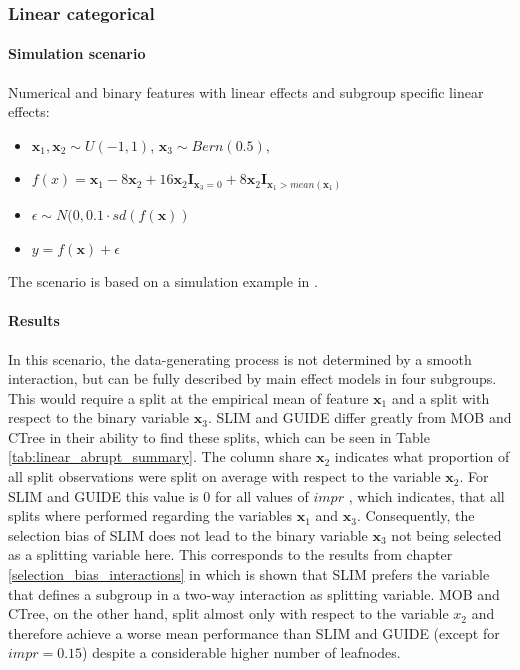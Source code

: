 \subsubsection{Linear categorical} 

\paragraph{Simulation scenario}
Numerical and binary features with linear effects and subgroup specific linear effects:
\begin{itemize}
    \item $\textbf{x}_1, \textbf{x}_2 \sim U(-1,1)$, $\textbf{x}_3 \sim Bern(0.5)$,  
    \item $ f(x) =  \textbf{x}_{1} - 8  \textbf{x}_2 + 16  \textbf{x}_2  \mathbf{I}_{\textbf{x}_3 = 0} + 8  \textbf{x}_2  \mathbf{I}_{\textbf{x}_1 > mean(\textbf{x}_1)} $
    \item $\epsilon \sim N(0, 0.1 \cdot sd(f(\textbf{x}))$
    \item $y = f(\textbf{x}) + \epsilon$          
\end{itemize}

The scenario is based on a simulation example in \citep{Herbinger.2022}.

\paragraph{Results}
In this scenario, the data-generating process is not determined by a smooth interaction, but can be fully described by main effect models in four subgroups.
This would require a split at the empirical mean of  feature $\textbf{x}_1$ and a split with respect to the binary variable $\textbf{x}_3$. 
SLIM and GUIDE differ greatly from MOB and CTree in their ability to find these splits, which can be seen in Table \ref{tab:linear_abrupt_summary}. 
The column share $\textbf{x}_2$ indicates what proportion of all split observations were split on average with respect to the variable $\textbf{x}_2$.
For SLIM and GUIDE this value is $0$ for all values of $impr$ , which indicates, that all splits where performed regarding the variables $\textbf{x}_1$ and $\textbf{x}_3$.  Consequently, the selection bias of SLIM does not lead to the binary variable $\textbf{x}_3$ not being selected as a splitting variable here. This corresponds to the results from chapter \ref{selection_bias_interactions} in which is shown that SLIM prefers the variable that defines a subgroup in a two-way interaction as  splitting variable.
MOB and CTree, on the other hand, split almost only with respect to the variable $x_2$ and therefore achieve a worse mean performance than SLIM and GUIDE (except for $impr = 0.15$) despite a considerable higher number of leafnodes.

